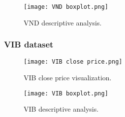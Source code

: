 \documentclass{ieeeojies}
\begin{document}
\begin{figure}[H]
	\centering
	\texttt{[image: VND boxplot.png]}
	\caption{VND descriptive analysis.\centering}
	\label{fig8}
\end{figure}

\subsubsection{VIB dataset}
\begin{figure}[H]
	\centering
	\texttt{[image: VIB close price.png]}
	\caption{VIB close price visualization.\centering}
	\label{fig1}
\end{figure}
\begin{figure}[H]
	\centering
	\texttt{[image: VIB boxplot.png]}
	\caption{VIB descriptive analysis.\centering}
	\label{fig1}
\end{figure}
\end{document}
